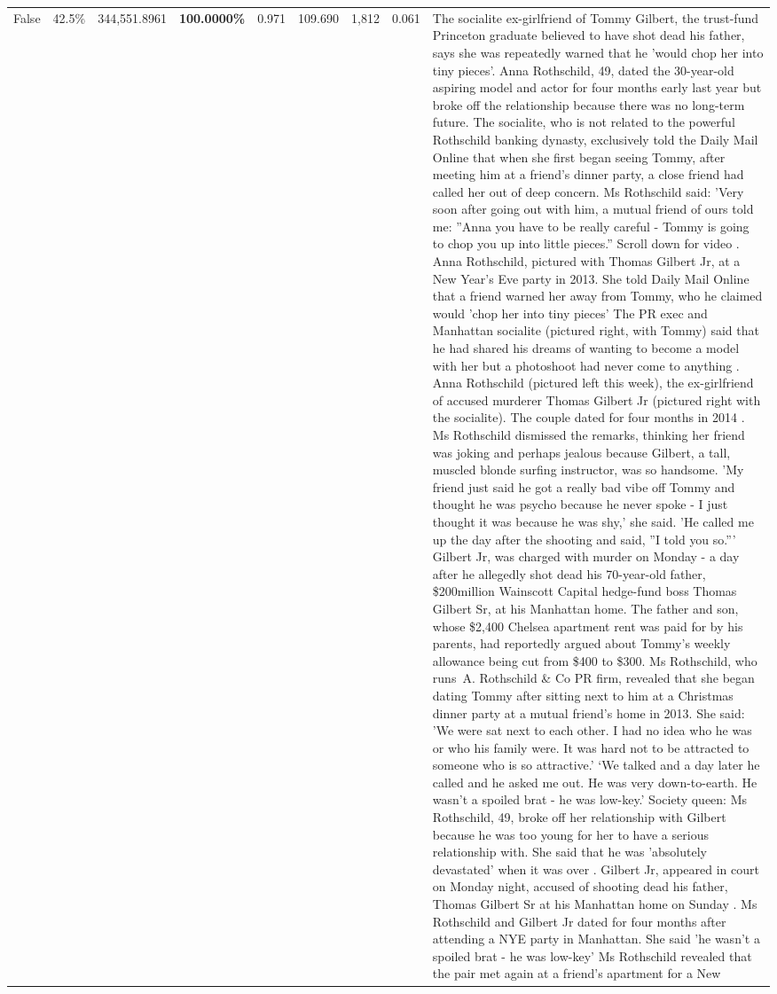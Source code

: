 \begin{table}[H]
\begin{tabular}{lllrlllll}
False & 42.5\% & 344,551.8961 & \bfseries \color{red} 100.0000\% & 0.971 & 109.690 & 1,812 & 0.061 & The socialite ex-girlfriend of Tommy Gilbert, the trust-fund Princeton graduate believed to have shot dead his father, says she was repeatedly warned that he 'would chop her into tiny pieces'. Anna Rothschild, 49, dated the 30-year-old aspiring model and actor for four months early last year but broke off the relationship because there was no long-term future. The socialite, who is not related to the powerful Rothschild banking dynasty, exclusively told the Daily Mail Online that when she first began seeing Tommy, after meeting him at a friend's dinner party, a close friend had called her out of deep concern. Ms Rothschild said: 'Very soon after going out with him, a mutual friend of ours told me: ''Anna you have to be really careful - Tommy is going to chop you up into little pieces.'' Scroll down for video . Anna Rothschild, pictured with Thomas Gilbert Jr, at a New Year's Eve party in 2013. She told Daily Mail Online that a friend warned her away from Tommy, who he claimed would 'chop her into tiny pieces' The PR exec and Manhattan socialite (pictured right, with Tommy) said that he had shared his dreams of wanting to become a model with her but a photoshoot had never come to anything . Anna Rothschild (pictured left this week), the ex-girlfriend of accused murderer Thomas Gilbert Jr (pictured right with the socialite). The couple dated for four months in 2014 . Ms Rothschild dismissed the remarks, thinking her friend was joking and perhaps jealous because Gilbert, a tall, muscled blonde surfing instructor, was so handsome. 'My friend just said he got a really bad vibe off Tommy and thought he was psycho because he never spoke - I just thought it was because he was shy,' she said. 'He called me up the day after the shooting and said, ''I told you so.''' Gilbert Jr, was charged with murder on Monday - a day after he allegedly shot dead his 70-year-old father, \$200million Wainscott Capital hedge-fund boss Thomas Gilbert Sr, at his Manhattan home. The father and son, whose \$2,400 Chelsea apartment rent was paid for by his parents, had reportedly argued about Tommy's weekly allowance being cut from \$400 to \$300. Ms Rothschild, who runs A. Rothschild \& Co PR firm, revealed that she began dating Tommy after sitting next to him at a Christmas dinner party at a mutual friend's home in 2013. She said: 'We were sat next to each other. I had no idea who he was or who his family were. It was hard not to be attracted to someone who is so attractive.' ‘We talked and a day later he called and he asked me out. He was very down-to-earth. He wasn’t a spoiled brat - he was low-key.’ Society queen: Ms Rothschild, 49, broke off her relationship with Gilbert because he was too young for her to have a serious relationship with. She said that he was 'absolutely devastated' when it was over . Gilbert Jr, appeared in court on Monday night, accused of shooting dead his father, Thomas Gilbert Sr at his Manhattan home on Sunday . Ms Rothschild and Gilbert Jr dated for four months after attending a NYE party in Manhattan. She said 'he wasn't a spoiled brat - he was low-key' Ms Rothschild revealed that the pair met again at a friend’s apartment for a New 
\end{tabular}
\end{table}
